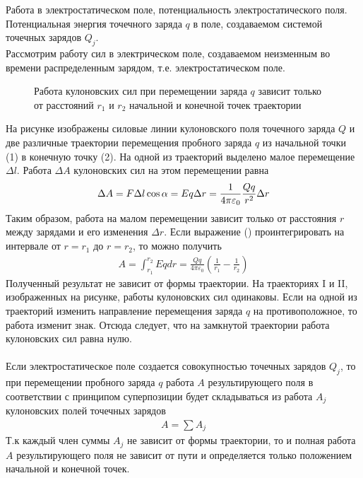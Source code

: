 \documentclass[__main__.tex]{subfiles}
\begin{document}
Работа в электростатическом поле, потенциальность электростатического поля. Потенциальная энергия точечного заряда $q$ в поле, создаваемом системой точечных зарядов $Q_j$.\\

Рассмотрим работу сил в электрическом поле, создаваемом неизменным во времени распределенным зарядом, т.е. электростатическом поле.
\begin{figure}[h]
    \center{\texttt{[image: c-10-1]}}
    \caption{Работа кулоновских сил при перемещении заряда $q$ зависит только от расстояний $r_1$ и $r_2$ начальной и конечной точек траектории}
\end{figure}

На рисунке изображены силовые линии кулоновского поля точечного заряда $Q$ и две различные траектории перемещения пробного заряда $q$ из начальной точки (1) в конечную точку (2). На одной из траекторий выделено малое перемещение $\Delta l$. Работа $\Delta A$ кулоновских сил на этом перемещении равна
\begin{gather}
    \llabel{c10-1}
    \Delta A = F\Delta{l}\cos\alpha = Eq\Delta r = \frac{1}{4\pi\varepsilon_0}\frac{Qq}{r^2}\Delta r
\end{gather}
Таким образом, работа на малом перемещении зависит только от расстояния $r$ между зарядами и его изменения $\Delta r$. Если выражение () проинтегрировать на интервале от $r=r_1$ до $r=r_2$, то можно получить
\begin{gather*}
    A = \int_{r_1}^{r_2}Eqdr = \frac{Qq}{4\pi\varepsilon_0}\left(\frac{1}{r_1}-\frac{1}{r_2}\right)
\end{gather*}
Полученный результат не зависит от формы траектории. На траекториях I и II, изображенных на рисунке, работы кулоновских сил одинаковы. Если на одной из траекторий изменить направление перемещения заряда $q$ на противоположное, то работа изменит знак. Отсюда следует, что на замкнутой траектории работа кулоновских сил равна нулю.\\\\
Если электростатическое поле создается совокупностью точечных зарядов $Q_j$, то при перемещении пробного заряда $q$ работа $A$ результирующего поля в соответствии с принципом суперпозиции будет складываться из работа $A_j$  кулоновских полей точечных зарядов
\begin{gather*}
    A = \sum A_j
\end{gather*}
Т.к каждый член суммы $A_j$ не зависит от формы траектории, то и полная работа $A$ результирующего поля не зависит от пути и определяется только положением начальной и конечной точек.
\end{document}
